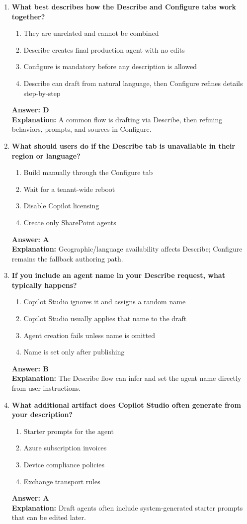 \documentclass[10pt]{article}
\begin{document}
\begin{enumerate}[leftmargin=*]
\item \textbf{What best describes how the Describe and Configure tabs work together?}
\begin{enumerate}[label=\Alph*.]
  \item They are unrelated and cannot be combined
  \item Describe creates final production agent with no edits
  \item Configure is mandatory before any description is allowed
  \item Describe can draft from natural language, then Configure refines details step-by-step
\end{enumerate}
\textbf{Answer: D}\\
\textbf{Explanation:} A common flow is drafting via Describe, then refining behaviors, prompts, and sources in Configure.

\item \textbf{What should users do if the Describe tab is unavailable in their region or language?}
\begin{enumerate}[label=\Alph*.]
  \item Build manually through the Configure tab
  \item Wait for a tenant-wide reboot
  \item Disable Copilot licensing
  \item Create only SharePoint agents
\end{enumerate}
\textbf{Answer: A}\\
\textbf{Explanation:} Geographic/language availability affects Describe; Configure remains the fallback authoring path.

\item \textbf{If you include an agent name in your Describe request, what typically happens?}
\begin{enumerate}[label=\Alph*.]
  \item Copilot Studio ignores it and assigns a random name
  \item Copilot Studio usually applies that name to the draft
  \item Agent creation fails unless name is omitted
  \item Name is set only after publishing
\end{enumerate}
\textbf{Answer: B}\\
\textbf{Explanation:} The Describe flow can infer and set the agent name directly from user instructions.

\item \textbf{What additional artifact does Copilot Studio often generate from your description?}
\begin{enumerate}[label=\Alph*.]
  \item Starter prompts for the agent
  \item Azure subscription invoices
  \item Device compliance policies
  \item Exchange transport rules
\end{enumerate}
\textbf{Answer: A}\\
\textbf{Explanation:} Draft agents often include system-generated starter prompts that can be edited later.


\end{enumerate}
\end{document}
